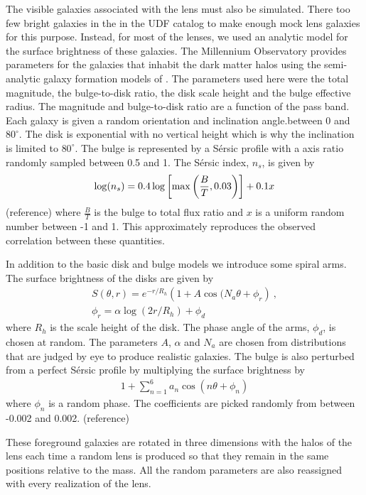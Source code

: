 \documentclass[useAMS,usenatbib]{mnras}
\newcommand{\red}[1]{{\color{red} #1}}
\newcommand{\degree}{^{\circ}}
\begin{document}
The visible galaxies associated with the lens must also be simulated. There  too few bright galaxies in the  in the UDF catalog to make enough mock lens galaxies for this purpose.  Instead, for most of the lenses, we used an analytic model for the surface brightness of these galaxies.  The Millennium Observatory provides parameters for the galaxies that inhabit the dark matter halos using the semi-analytic galaxy formation models of \citet{2011MNRAS.413..101G}.  The parameters used here were the total magnitude, the bulge-to-disk ratio, the disk scale height and the bulge effective radius.  The magnitude and bulge-to-disk ratio are a function of the pass band.  Each galaxy is given a random orientation and inclination angle.between 0 and $80\degree$.  The disk is exponential with no vertical height which is why the inclination is limited to $80\degree$.  The bulge is represented by a S\'{e}rsic profile with a axis ratio randomly sampled between 0.5 and 1.  The S\'{e}rsic index, $n_s$, is given by 
\begin{align}
\log( n_s )= 0.4 \log\left[ {\rm max}\left(\frac{B}{T},0.03\right)\right] + 0.1 x 
\end{align}
\red{(reference)} where $\frac{B}{T}$ is the bulge to total flux ratio and $x$ is a uniform random number between -1 and 1.  This approximately reproduces the observed correlation between these quantities. 

In addition to the basic disk and bulge models we introduce some spiral arms.  The surface brightness of 
the disks are given by
\begin{align}
S(\theta,r) = e^{-r/R_h} \left( 1 + A \cos(N_a\theta + \phi_r \right) ~, \\
\phi_r = \alpha\log(2 r/ R_h) + \phi_d \nonumber
\end{align}
where $R_h$ is the scale height of the disk.  The phase angle of the arms, $\phi_d$, is chosen at random.  The parameters $A$, $\alpha$ and $N_a$ are chosen from distributions that are judged by eye to produce realistic 
galaxies.
The bulge is also perturbed from a perfect S\'{e}rsic profile by multiplying the surface brightness by
\begin{align}
1+\sum_{n=1}^6 a_n \cos\left( n \theta  + \phi_n \right)
\end{align}
where $\phi_n$ is a random phase.  The coefficients are picked randomly from between -0.002 and 0.002. \red{(reference)}

These foreground galaxies are rotated in three dimensions with the halos of the lens each time a random lens is produced so that they remain in the same positions relative to the mass.  All the random parameters are also reassigned with every realization of the lens.
\end{document}
